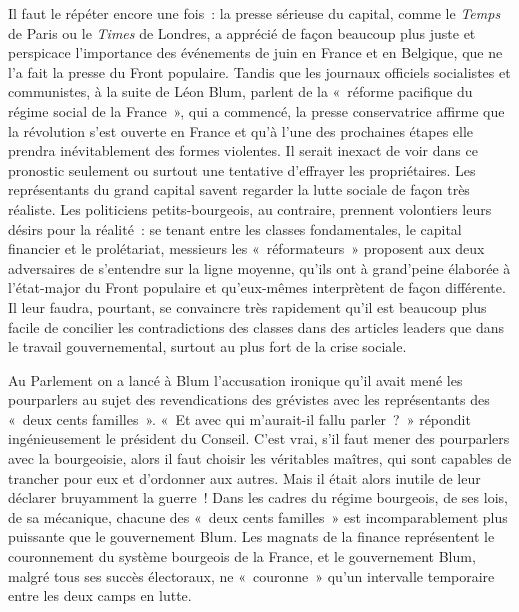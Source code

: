 \documentclass[french,twoside]{book} %
\newcommand\chaptercont{} %
\begin{document}
\chaptercont
\noindent Il faut le répéter encore une fois : la presse sérieuse du capital, comme le \emph{Temps} de Paris ou le \emph{Times} de Londres, a apprécié de façon beaucoup plus juste et perspicace l’importance des événements de juin en France et en Belgique, que ne l’a fait la presse du Front populaire. Tandis que les journaux officiels socialistes et communistes, à la suite de Léon Blum, parlent de la « réforme pacifique du régime social de la France », qui a commencé, la presse conservatrice affirme que la révolution s’est ouverte en France et qu’à l’une des prochaines étapes elle prendra inévitablement des formes violentes. Il serait inexact de voir dans ce pronostic seulement ou surtout une tentative d’effrayer les propriétaires. Les représentants du grand capital savent regarder la lutte sociale de façon très réaliste. Les politiciens petits-bourgeois, au contraire, prennent volontiers leurs désirs pour la réalité : se tenant entre les classes fondamentales, le capital financier et le prolétariat, messieurs les « réformateurs » proposent aux deux adversaires de s’entendre sur la ligne moyenne, qu’ils ont à grand’peine élaborée à l’état-major du Front populaire et qu’eux-mêmes interprètent de façon différente. Il leur faudra, pourtant, se convaincre très rapidement qu’il est beaucoup plus facile de concilier les contradictions des classes dans des articles leaders que dans le travail gouvernemental, surtout au plus fort de la crise sociale.\par
 Au Parlement on a lancé à Blum l’accusation ironique qu’il avait mené les pourparlers au sujet des revendications des grévistes avec les représentants des « deux cents familles ». « Et avec qui m’aurait-il fallu parler ? » répondit ingénieusement le président du Conseil. C’est vrai, s’il faut mener des pourparlers avec la bourgeoisie, alors il faut choisir les véritables maîtres, qui sont capables de trancher pour eux et d’ordonner aux autres. Mais il était alors inutile de leur déclarer bruyamment la guerre ! Dans les cadres du régime bourgeois, de ses lois, de sa mécanique, chacune des « deux cents familles » est incomparablement plus puissante que le gouvernement Blum. Les magnats de la finance représentent le couronnement du système bourgeois de la France, et le gouvernement Blum, malgré tous ses succès électoraux, ne « couronne » qu’un intervalle temporaire entre les deux camps en lutte.\par
\end{document}
